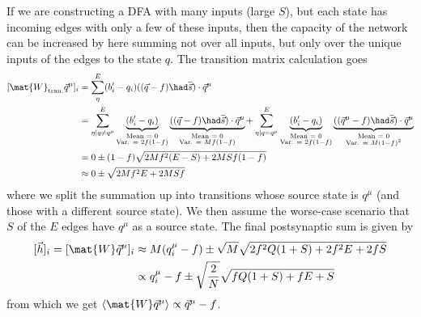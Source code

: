 If we are constructing a DFA with many inputs (large $S$), but each state has incoming edges with only a few of these inputs, then the capacity of the network can be increased by here summing not over all inputs, but only over the unique inputs of the edges to the state $q$. The transition matrix calculation goes
\begin{equation}
\begin{split}
    [\mat{W}_\text{tran.} \vec{q}^\mu]_i & = \sum_\eta^E (b_i^{\prime} -q_i ) ((\vec{q} -f) \had \overline{\vec{s}} ) \cdot \vec{q}^\mu \\
    & = \sum_{\eta | q \neq q^\mu}^E \underbrace{(b_i^{\prime} -q_i )}_{\substack{\text{Mean = 0} \\ \text{Var. = } 2f(1-f)}}\underbrace{((\vec{q} -f) \had \overline{\vec{s}} ) \cdot \vec{q}^\mu}_{\substack{\text{Mean = 0} \\ \text{Var. = } Mf(1-f) }} + \sum_{\eta | q = q^\mu}^E \underbrace{(b_i^{\prime} -q_i)}_{\substack{\text{Mean = 0} \\ \text{Var. = } 2f(1-f)}}\underbrace{((\vec{q}^\mu -f) \had \overline{\vec{s}} ) \cdot \vec{q}^\mu}_{\substack{\text{Mean = 0} \\ \text{Var. = } M(1-f)^2 }} \\
    & = 0 \pm (1-f)\sqrt{2Mf^2(E-S) + 2MSf(1-f)} \\
    & \approx 0 \pm \sqrt{2Mf^2E + 2MSf} \\
\end{split}
\end{equation}
where we split the summation up into transitions whose source state is $q^\mu$ (and those with a different source state). We then assume the worse-case scenario that $S$ of the $E$ edges have $q^\mu$ as a source state. The final postsynaptic sum is given by
\begin{equation}
\begin{split}
[\vec{h}]_i = [\mat{W} \vec{q}^\mu]_i & \approx M(q_i^\mu -f) \pm \sqrt{M}\sqrt{2f^2Q(1+S)+ 2f^2E + 2fS} \\
& \propto q_i^\mu -f \pm \sqrt{\frac{2}{N}} \sqrt{fQ(1+S)+ fE + S} \\
\end{split}
\end{equation}
from which we get $\langle \mat{W}\vec{q}^\mu \rangle \propto \vec{q}^\mu -f$.

